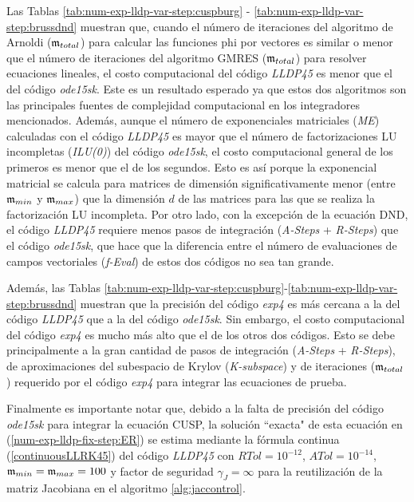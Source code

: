 Las Tablas \ref{tab:num-exp-lldp-var-step:cuspburg} - \ref{tab:num-exp-lldp-var-step:brussdnd} muestran que, cuando el número de iteraciones del algoritmo de Arnoldi ($\mathfrak{m}_{total}$) para calcular las funciones phi por vectores es similar o menor que el número de iteraciones del algoritmo GMRES ($\mathfrak{m}_{total}$) para resolver ecuaciones lineales, el costo computacional del código \emph{LLDP45} es menor que el del código \emph{ode15sk}. Este es un resultado esperado ya que estos dos algoritmos son las principales fuentes de complejidad computacional en los integradores mencionados. Además, aunque el número de exponenciales matriciales (\textit{ME}) calculadas con el código \emph{LLDP45} es mayor que el número de factorizaciones LU incompletas (\textit{ILU(0)}) del código \emph{ode15sk}, el costo computacional general de los primeros es menor que el de los segundos. Esto es así porque la exponencial matricial se calcula para matrices de dimensión significativamente menor (entre $\mathfrak{m}_{min}$ y $\mathfrak{m}_{max}$) que la dimensión $d$ de las matrices para las que se realiza la factorización LU incompleta. Por otro lado, con la excepción de la ecuación DND, el código \emph{LLDP45} requiere menos pasos de integración (\textit{A-Steps} + \textit{R-Steps}) que el código \emph{ode15sk}, que hace que la diferencia entre el número de evaluaciones de campos vectoriales (\textit{f-Eval}) de estos dos códigos no sea tan grande.

Además, las Tablas \ref{tab:num-exp-lldp-var-step:cuspburg}-\ref{tab:num-exp-lldp-var-step:brussdnd} muestran que la precisión del código \emph{exp4} es más cercana a la del código \emph{LLDP45} que a la del código \emph{ode15sk}. Sin embargo, el costo computacional del código \emph{exp4} es mucho más alto que el de los otros dos códigos. Esto se debe principalmente a la gran cantidad de pasos de integración (\textit{A-Steps} + \textit{R-Steps}), de aproximaciones del subespacio de Krylov (\textit{K-subspace}) y de iteraciones ($\mathfrak{m}_ {total}$) requerido por el código \emph{exp4} para integrar las ecuaciones de prueba.

Finalmente es importante notar que, debido a la falta de precisión del código \emph{ode15sk} para integrar la ecuación CUSP, la solución ``exacta" de esta ecuación en (\ref{num-exp-lldp-fix-step:ER}) se estima mediante la fórmula continua (\ref{continuousLLRK45}) del código \emph{LLDP45} con $RTol = 10^{-12}$, $ATol = 10^{-14}$, $\mathfrak{m}_{min} = \mathfrak{m}_{max} = 100$ y factor de seguridad $\gamma_J=\infty$ para la reutilización de la matriz Jacobiana en el algoritmo \ref{alg:jaccontrol}.